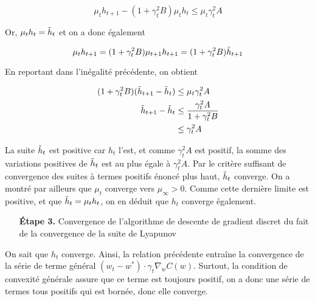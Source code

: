 \documentclass{article}
\begin{document}
\begin{equation*}
    \mu_t h_{t+1} - (1 + \gamma_t^{2}B) \mu_t h_t \leq \mu_t \gamma_t^{2}A
\end{equation*}

Or, $\mu_t h_t = \Tilde{h}_t$ et on a donc également

\begin{equation*}
\mu_t h_{t+1} = (1 + \gamma_t^{2}B) \mu_{t+1} h_{t+1} = (1 + \gamma_t^{2}B) \Tilde{h}_{t + 1} 
\end{equation*}

En reportant dans l'inégalité précédente, on obtient

\begin{equation*}
    \begin{split}
        (1 + \gamma_t^{2}B)(\Tilde{h}_{t + 1} - \Tilde{h}_t) & \leq \mu_t \gamma_t^{2}A \\
        \Tilde{h}_{t + 1} - \Tilde{h}_t & \leq \frac{\gamma_t^{2}A}{1 + \gamma_t^{2}B} \\
        & \leq \gamma_t^{2}A
    \end{split}
\end{equation*}

La suite $\Tilde{h}_t$ est positive car $h_t$ l'est, et comme $\gamma_t^{2}A$ est positif, la somme des variations positives de $\Tilde{h}_t$ est au plus égale à $\gamma_t^{2}A$. Par le critère suffisant de convergence des suites à termes positifs énoncé plus haut, $\Tilde{h}_t$ converge. On a montré par ailleurs que $\mu_t$ converge vers $\mu_{\infty} > 0$. Comme cette dernière limite est positive, et que $\Tilde{h}_t = \mu_t h_t$, on en déduit que $h_t$ converge également. 
\bigskip

\begin{itemize}
  \item[\textbf{Étape 3.}] Convergence de l'algorithme de descente de gradient discret du fait de la convergence de la suite de Lyapunov 
\end{itemize}
\bigskip

On sait que $h_t$ converge. Ainsi, la relation précédente entraîne la convergence de la série de terme général $(w_t - w^{*}) \cdot \gamma_t \nabla_wC(w)$. Surtout, la condition de convexité générale assure que ce terme est toujours positif, on a donc une série de termes tous positifs qui est bornée, donc elle converge.
\bigskip
\end{document}
